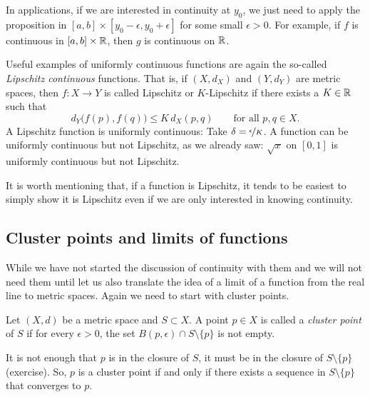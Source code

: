 In applications, if we are interested in continuity at $y_0$, we just
need to apply the proposition in $[a,b] \times [y_0-\epsilon,y_0+\epsilon]$
for some small $\epsilon > 0$.  For example, if $f$ is continuous in
$[a,b] \times {\mathbb{R}}$, then $g$ is continuous on ${\mathbb{R}}$.

\begin{example}
Useful examples of uniformly continuous functions are again the so-called
\emph{Lipschitz continuous}%
%
functions.  That is, if
$(X,d_X)$ and $(Y,d_Y)$ are metric spaces, then $f \colon X \to Y$
is called Lipschitz or $K$-Lipschitz if there exists a $K \in {\mathbb{R}}$ such that
\begin{equation*}
d_Y\bigl(f(p),f(q)\bigr) \leq K \, d_X(p,q)
\qquad \text{for all } p,q \in X.
\end{equation*}
A Lipschitz function is uniformly continuous:
Take $\delta = \nicefrac{\epsilon}{K}$.
A function can be uniformly continuous
but not Lipschitz,
as we already saw: $\sqrt{x}$ on $[0,1]$
is uniformly continuous but not Lipschitz.

It is worth mentioning that,
if a function is Lipschitz, it tends to be
easiest to simply show it is Lipschitz even if we are only
interested in knowing continuity.
\end{example}

\subsection{Cluster points and limits of functions}

While we have not started the discussion of continuity with them and
we will not need them until
let us also
translate the idea of a limit of a function from the real line to metric
spaces.
Again we need to start with cluster points.

\begin{defn}
Let $(X,d)$ be a metric space and
$S \subset X$. A point $p \in X$ is called
a \emph{cluster point} of $S$
if for every $\epsilon > 0$, the set $B(p,\epsilon) \cap S
\setminus \{ p \}$ is not empty.
\end{defn}

It is not enough that $p$ is in the closure of $S$,
it must be in the closure of
$S \setminus \{ p \}$ (exercise).
So, $p$ is a cluster point if and only if there exists a sequence in $S \setminus
\{ p \}$ that converges to $p$.

